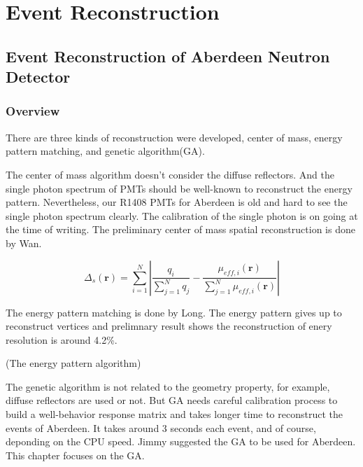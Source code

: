 \chapter {Event Reconstruction}
\section {Event Reconstruction of Aberdeen Neutron Detector}
\subsection {Overview}
There are three kinds of reconstruction were developed, center of mass,
energy pattern matching, and genetic algorithm(GA).

The center of mass algorithm doesn't consider the diffuse reflectors.
And the single photon spectrum of PMTs should be well-known to reconstruct the energy pattern.
Nevertheless, our R1408 PMTs for Aberdeen is old and hard to see the single photon spectrum clearly.
The calibration of the single photon is on going at the time of writing.
The preliminary center of mass spatial reconstruction is done by Wan.


\begin{equation}
\label{eq:reconstructionCM}
\Delta_{s}(\mathbf{r}) = {\sum}^N_{i=1} |   \frac{q_i}{\sum^N_{j=1}q_j}  -  \frac { \mu_{eff,i}(\mathbf{r}) }{ \sum^N_{j=1}\mu_{eff,i}(\mathbf{r}) }|
\end{equation}


The energy pattern matching is done by Long.
The energy pattern gives up to reconstruct vertices and prelimnary result shows
the reconstruction of enery resolution is around 4.2\%.


(The energy pattern algorithm)







The genetic algorithm is not related to the geometry property, for example,
diffuse reflectors are used or not. But GA needs careful calibration process
to build a well-behavior response matrix and takes longer time to reconstruct
the events of Aberdeen. It takes around 3 seconds each event, and of course, deponding
on the CPU speed. Jimmy suggested the GA to be used for Aberdeen.
This chapter focuses on the GA.











